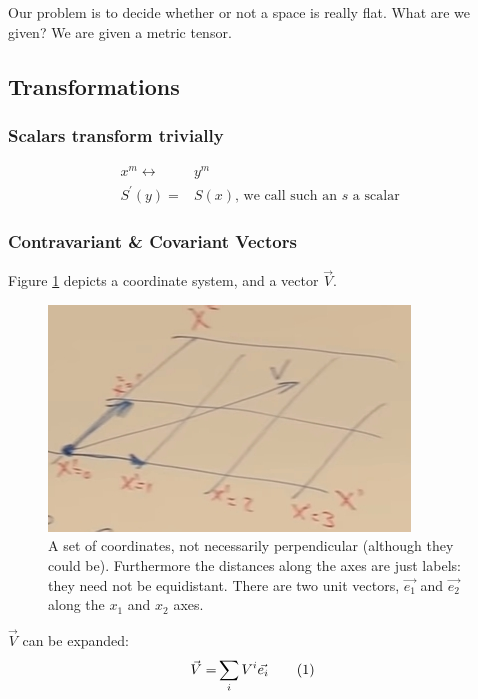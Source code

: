 \documentclass[]{article}
\newcommand\numberthis{\addtocounter{equation}{1}\tag{\theequation}}
\begin{document}
Our problem is to decide whether or not a space is really flat. What are we given? We are given a metric tensor.

\subsection{Transformations}

\subsubsection{Scalars transform trivially}

\begin{align*}
	x^m \leftrightarrow& y^m \\
	S^\prime(y) =& S(x) \text{, we call such an $s$ a scalar}
\end{align*}

\subsubsection{Contravariant \& Covariant Vectors}

Figure \ref{fig:gr-2-coordinates} depicts a coordinate system, and a vector $\vec{V}$.
\begin{figure}[H]
	\caption[A set of coordinates, not necessarily perpendicular.]{A set of coordinates, not necessarily perpendicular (although they could be). Furthermore the distances along the axes are just labels: they need not be equidistant. There are two unit vectors, $\vec{e_1}$ and $\vec{e_2}$ along the $x_1$ and $x_2$ axes.}\label{fig:gr-2-coordinates}
	\includegraphics{gr-2-coordinates}
\end{figure}

$\vec{V}$ can be expanded:
\begin{align*}
	\vec{V} =& \sum_i V^i \vec{e_i} \numberthis \label{eq:contravariant:components}
\end{align*}
\end{document}
